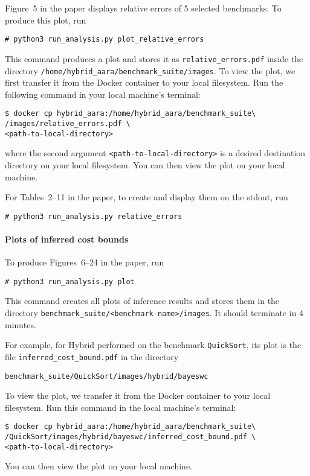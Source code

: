 Figure~5 in the paper displays relative errors of 5 selected benchmarks.
%
To produce this plot, run
\begin{verbatim}
# python3 run_analysis.py plot_relative_errors
\end{verbatim}
%
This command produces a plot and stores it as
\texttt{relative\_errors.pdf} inside the directory
\texttt{/home/hybrid\_aara/benchmark\_suite/images}.
%
To view the plot, we first transfer it from the Docker container to your local
filesystem.
%
Run the following command in your local machine's terminal:
\begin{verbatim}
$ docker cp hybrid_aara:/home/hybrid_aara/benchmark_suite\
/images/relative_errors.pdf \
<path-to-local-directory>
\end{verbatim}
where the second argument \texttt{<path-to-local-directory>} is a desired
destination directory on your local filesystem.
%
You can then view the plot on your local machine.

For Tables~2--11 in the paper, to create and display them on the stdout, run
\begin{verbatim}
# python3 run_analysis.py relative_errors
\end{verbatim}

\paragraph{Plots of inferred cost bounds}

To produce Figures~6--24 in the paper, run
\begin{verbatim}
# python3 run_analysis.py plot
\end{verbatim}
%
This command creates all plots of inference results and stores them in the
directory \texttt{benchmark\_suite/<benchmark-name>/images}.
%
It should terminate in 4 minutes.

For example, for Hybrid \BayesWC{} performed on the benchmark
\texttt{QuickSort}, its plot is the file \texttt{inferred\_cost\_bound.pdf} in
the directory
\begin{verbatim}
benchmark_suite/QuickSort/images/hybrid/bayeswc
\end{verbatim}
%
To view the plot, we transfer it from the Docker container to your local
filesystem.
%
Run this command in the local machine's terminal:
\begin{verbatim}
$ docker cp hybrid_aara:/home/hybrid_aara/benchmark_suite\
/QuickSort/images/hybrid/bayeswc/inferred_cost_bound.pdf \
<path-to-local-directory>
\end{verbatim}
%
You can then view the plot on your local machine.

